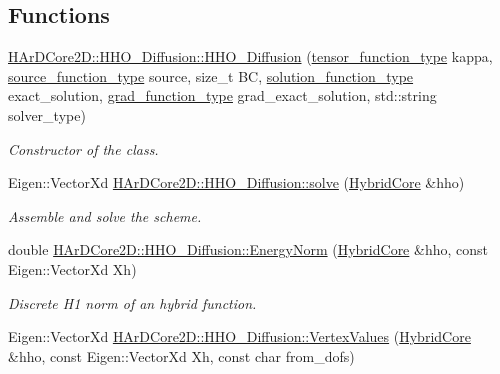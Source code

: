 \subsection*{Functions}
\begin{DoxyCompactItemize}
\item 
\hyperlink{group__HHO__Diffusion_ga9ab2e2cdf0c77f60069f7572c587c4f1}{H\+Ar\+D\+Core2\+D\+::\+H\+H\+O\+\_\+\+Diffusion\+::\+H\+H\+O\+\_\+\+Diffusion} (\hyperlink{classHArDCore2D_1_1HHO__Diffusion_acc4abb92b452d6407d45a87823fb47f9}{tensor\+\_\+function\+\_\+type} kappa, \hyperlink{classHArDCore2D_1_1HHO__Diffusion_ade095df766ff04bf09385a163136e5c0}{source\+\_\+function\+\_\+type} source, size\+\_\+t BC, \hyperlink{classHArDCore2D_1_1HHO__Diffusion_ac2ddc18a37be70e4767a9040fb6a09f6}{solution\+\_\+function\+\_\+type} exact\+\_\+solution, \hyperlink{classHArDCore2D_1_1HHO__Diffusion_a14797a72cc96ee5ea6fc45e4986d6a84}{grad\+\_\+function\+\_\+type} grad\+\_\+exact\+\_\+solution, std\+::string solver\+\_\+type)
\begin{DoxyCompactList}\small\item\em Constructor of the class. \end{DoxyCompactList}\item 
\mbox{\label{group__HHO__Diffusion_ga1aebf22f19de92c115aed69ba394de88}} 
Eigen\+::\+Vector\+Xd \hyperlink{group__HHO__Diffusion_ga1aebf22f19de92c115aed69ba394de88}{H\+Ar\+D\+Core2\+D\+::\+H\+H\+O\+\_\+\+Diffusion\+::solve} (\hyperlink{classHArDCore2D_1_1HybridCore}{Hybrid\+Core} \&hho)
\begin{DoxyCompactList}\small\item\em Assemble and solve the scheme. \end{DoxyCompactList}\item 
\mbox{\label{group__HHO__Diffusion_ga1f21d17ee818df40d6c0081300c44982}} 
double \hyperlink{group__HHO__Diffusion_ga1f21d17ee818df40d6c0081300c44982}{H\+Ar\+D\+Core2\+D\+::\+H\+H\+O\+\_\+\+Diffusion\+::\+Energy\+Norm} (\hyperlink{classHArDCore2D_1_1HybridCore}{Hybrid\+Core} \&hho, const Eigen\+::\+Vector\+Xd Xh)
\begin{DoxyCompactList}\small\item\em Discrete H1 norm of an hybrid function. \end{DoxyCompactList}\item 
Eigen\+::\+Vector\+Xd \hyperlink{group__HHO__Diffusion_ga2b77651b50be012339ca136f4fd90e81}{H\+Ar\+D\+Core2\+D\+::\+H\+H\+O\+\_\+\+Diffusion\+::\+Vertex\+Values} (\hyperlink{classHArDCore2D_1_1HybridCore}{Hybrid\+Core} \&hho, const Eigen\+::\+Vector\+Xd Xh, const char from\+\_\+dofs)

\end{DoxyCompactItemize}
